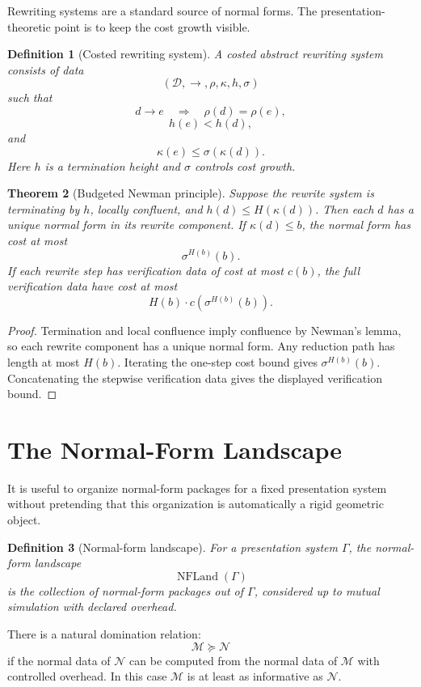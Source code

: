 \documentclass[11pt]{article}
\newtheorem{theorem}{Theorem}[section]
\newtheorem{definition}[theorem]{Definition}
\begin{document}
Rewriting systems are a standard source of normal forms. The presentation-theoretic point is to keep the cost growth visible.

\begin{definition}[Costed rewriting system]
A costed abstract rewriting system consists of data
\[
(\mathcal D,\to,\rho,\kappa,h,\sigma)
\]
such that
\[
d\to e\quad\Longrightarrow\quad \rho(d)=\rho(e),
\]
\[
h(e)<h(d),
\]
and
\[
\kappa(e)\leq \sigma(\kappa(d)).
\]
Here \(h\) is a termination height and \(\sigma\) controls cost growth.
\end{definition}

\begin{theorem}[Budgeted Newman principle]
Suppose the rewrite system is terminating by \(h\), locally confluent, and \(h(d)\leq H(\kappa(d))\). Then each \(d\) has a unique normal form in its rewrite component. If \(\kappa(d)\leq b\), the normal form has cost at most
\[
\sigma^{H(b)}(b).
\]
If each rewrite step has verification data of cost at most \(c(b)\), the full verification data have cost at most
\[
H(b)\cdot c(\sigma^{H(b)}(b)).
\]
\end{theorem}

\begin{proof}
Termination and local confluence imply confluence by Newman's lemma, so each rewrite component has a unique normal form. Any reduction path has length at most \(H(b)\). Iterating the one-step cost bound gives \(\sigma^{H(b)}(b)\). Concatenating the stepwise verification data gives the displayed verification bound.
\end{proof}

\section{The Normal-Form Landscape}

It is useful to organize normal-form packages for a fixed presentation system without pretending that this organization is automatically a rigid geometric object.

\begin{definition}[Normal-form landscape]
For a presentation system \(\Gamma\), the normal-form landscape
\[
\operatorname{NFLand}(\Gamma)
\]
is the collection of normal-form packages out of \(\Gamma\), considered up to mutual simulation with declared overhead.
\end{definition}

There is a natural domination relation:
\[
\mathcal M\succeq \mathcal N
\]
if the normal data of \(\mathcal N\) can be computed from the normal data of \(\mathcal M\) with controlled overhead. In this case \(\mathcal M\) is at least as informative as \(\mathcal N\).
\end{document}
